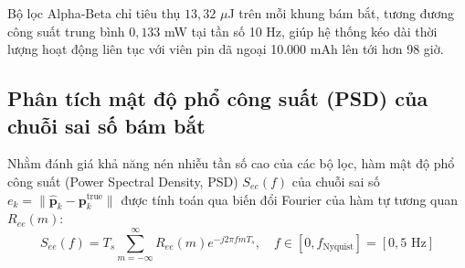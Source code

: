 Bộ lọc Alpha-Beta chỉ tiêu thụ $13{,}32$ $\mu$J trên mỗi khung bám bắt, tương đương công suất trung bình $0{,}133$ mW tại tần số 10 Hz, giúp hệ thống kéo dài thời lượng hoạt động liên tục với viên pin dã ngoại 10.000 mAh lên tới hơn 98 giờ.

\subsection{Phân tích mật độ phổ công suất (PSD) của chuỗi sai số bám bắt}

\hspace{0.5cm} Nhằm đánh giá khả năng nén nhiễu tần số cao của các bộ lọc, hàm mật độ phổ công suất (Power Spectral Density, PSD) $S_{ee}(f)$ của chuỗi sai số $e_k = \|\hat{\mathbf{p}}_k - \mathbf{p}_k^{\text{true}}\|$ được tính toán qua biến đổi Fourier của hàm tự tương quan $R_{ee}(m)$:
\begin{equation}
S_{ee}(f) = T_s \sum_{m=-\infty}^{\infty} R_{ee}(m) e^{-j 2\pi f m T_s}, \quad f \in [0, f_{\text{Nyquist}}] = [0, 5\text{ Hz}]
\label{eq:error-psd-fourier-formula-w15}
\end{equation}

\begin{table}[H]
\centering
\caption{Phân bố mật độ công suất sai số theo các dải tần số động học ($T_s = 100$ ms)}
\label{tab:error-psd-frequency-bands-w15}
\end{table}

